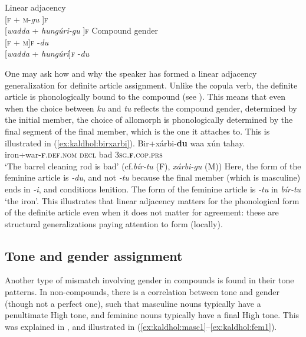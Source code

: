 \documentclass[output=paper]{langscibook}
\begin{document}
\begin{multicols}{2}
\ea\label{ex:kaldhol:FMgu}
		Linear adjacency\\
		{[}\textsc{f} + \textsc{m}-\textit{gu} ]\textsc{f}\\
		{[}\textit{wadda} + \textit{hung\'uri-gu} ]\textsc{f}
\ex\label{ex:kaldhol:FMdu}
		Compound gender\\
		{[}\textsc{f} + \textsc{m}]\textsc{f} -\textit{du}\\
		{[}\textit{wadda} + \textit{hung\'uri}]\textsc{f} -\textit{du}
\z
\end{multicols}
One may ask how and why the speaker has formed a linear adjacency generalization for definite article assignment. Unlike the copula verb, the definite article is phonologically bound to the compound (see ). This means that even when the choice between \textit{ku} and \textit{tu} reflects the compound gender, determined by the initial member, the choice of allomorph is phonologically determined by the final segment of the final member, which is the one it attaches to. This is illustrated in (\ref{ex:kaldhol:birxarbi}).
\ea\label{ex:kaldhol:birxarbi}
	\gll Bir+xárbi-\textbf{du} waa xún tahay.\\
	iron+war-\textsc{\textbf{f}.def.nom} \textsc{decl} bad \textsc{3sg.\textbf{f}}.\textsc{cop.prs}\\
	\glt `The barrel cleaning rod is bad' \hfill (cf.\@ \textit{bír-tu} (F), \textit{xárbi-gu} (M))
\z
Here, the form of the feminine article is \textit{-du}, and not \textit{-tu} because the final member (which is masculine) ends in \textit{-i}, and conditions lenition. The form of the feminine article is \textit{-tu} in \textit{bír-tu} `the iron'. This illustrates that linear adjacency matters for the phonological form of the definite article even when it does not matter for agreement: these are structural generalizations paying attention to form (locally).

\subsection{Tone and gender assignment}\label{sec:kaldhol:tone2}
Another type of mismatch involving gender in compounds is found in their tone patterns. In non-compounds, there is a correlation between tone and gender (though not a perfect one), such that masculine nouns typically have a penultimate High tone, and feminine nouns typically have a final High tone. This was explained in , and illustrated in (\ref{ex:kaldhol:masc1}--\ref{ex:kaldhol:fem1}).
\end{document}
